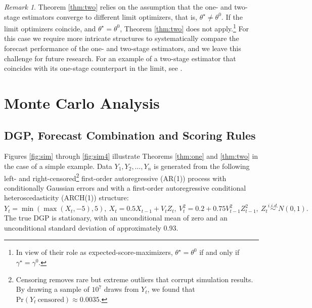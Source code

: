 \documentclass[12pt]{article}
\theoremstyle{definition}
\theoremstyle{remark}
\newtheorem{remark}{Remark}
\begin{document}
\begin{remark}
\label{rmk:derivassump} Theorem \ref{thm:two} relies on the assumption that the one- and two-stage estimators converge to different limit optimizers, that is, $\theta^{\star} \neq \theta^0$. If the limit optimizers coincide, and $\theta^{\star} = \theta^0$, Theorem \ref{thm:two} does not apply.\footnote{In view of their role as expected-score-maximizers, $\theta^{\star} = \theta^0$ if and only if $\gamma^{\star} = \gamma^0$.} For this case we require more intricate structures to systematically compare the forecast performance of the one- and two-stage estimators, and we leave this challenge for future research. For an example of a two-stage estimator that coincides with its one-stage counterpart in the limit, see \citet[sec. 2]{Pagan1986}.
\end{remark}

\section{Monte Carlo Analysis\label{sec:montecarlo}}

\subsection{DGP, Forecast Combination and Scoring Rules\label{subsec:montecarlodgp}}

Figures \ref{fig:sim} through \ref{fig:sim4} illustrate Theorems \ref{thm:one} and \ref{thm:two} in the case of a simple example. Data $Y_1, Y_2, \ldots, Y_n$ is generated from the following left- and right-censored\footnote{Censoring removes rare but extreme outliers that corrupt simulation results. By drawing a sample of $10^7$ draws from $Y_t$, we found that $\mathrm{Pr}(Y_t\ \mathrm{censored}) \approx 0.0035$.} first-order autoregressive (AR(1)) process with conditionally Gaussian errors and with a first-order autoregressive conditional heteroscedasticity (ARCH(1)) structure: 
\begin{equation*}
Y_t = \min(\max(X_t,-5),5),\ X_t = 0.5 X_{t-1} + V_t Z_t,\ V_t^2 = 0.2 + 0.75 V_{t-1}^2 Z_{t-1}^2,\ Z_t \overset{i.i.d.}{\sim} N(0,1).
\end{equation*}
The true DGP is stationary, with an unconditional mean of zero and an unconditional standard deviation of approximately 0.93.
\end{document}
